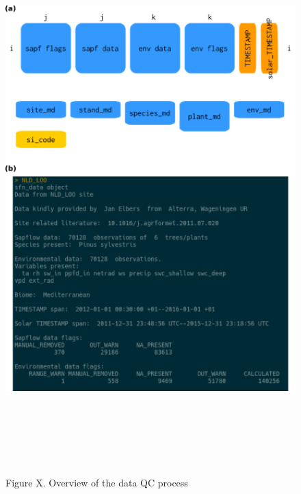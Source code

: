\documentclass[]{article}
\begin{document}
\begin{figure}

{\centering \includegraphics[height=800px]{resources/schematics} 

}

\caption{Figure X. Overview of the data QC process}\label{fig:fig_sfn_data}
\end{figure}

\pagebreak

\pagebreak
\end{document}
